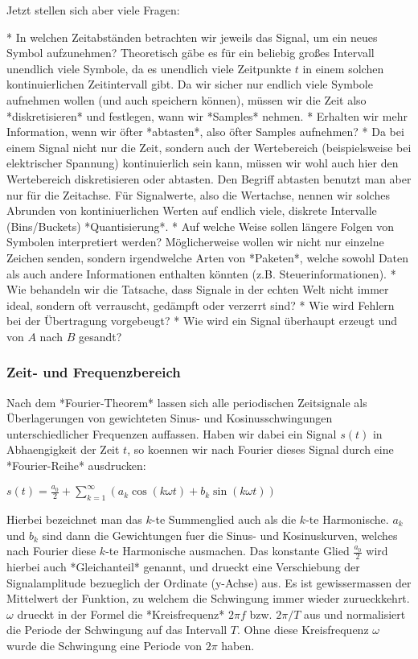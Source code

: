 Jetzt stellen sich aber viele Fragen:

* In welchen Zeitabständen betrachten wir jeweils das Signal, um ein neues
  Symbol aufzunehmen? Theoretisch gäbe es für ein beliebig großes Intervall
  unendlich viele Symbole, da es unendlich viele Zeitpunkte $t$ in einem solchen
  kontinuierlichen Zeitintervall gibt. Da wir sicher nur endlich viele Symbole
  aufnehmen wollen (und auch speichern können), müssen wir die Zeit also
  *diskretisieren* und festlegen, wann wir *Samples* nehmen.
* Erhalten wir mehr Information, wenn wir öfter *abtasten*, also öfter Samples
  aufnehmen?
* Da bei einem Signal nicht nur die Zeit, sondern auch der Wertebereich
  (beispielsweise bei elektrischer Spannung) kontinuierlich sein kann, müssen
  wir wohl auch hier den Wertebereich diskretisieren oder abtasten. Den Begriff
  abtasten benutzt man aber nur für die Zeitachse. Für Signalwerte, also die
  Wertachse, nennen wir solches Abrunden von kontiniuerlichen Werten auf endlich
  viele, diskrete Intervalle (Bins/Buckets) *Quantisierung*.
* Auf welche Weise sollen längere Folgen von Symbolen interpretiert werden?
  Möglicherweise wollen wir nicht nur einzelne Zeichen senden, sondern
  irgendwelche Arten von *Paketen*, welche sowohl Daten als auch andere
  Informationen enthalten könnten (z.B. Steuerinformationen).
* Wie behandeln wir die Tatsache, dass Signale in der echten Welt nicht immer
  ideal, sondern oft verrauscht, gedämpft oder verzerrt sind?
* Wie wird Fehlern bei der Übertragung vorgebeugt?
* Wie wird ein Signal überhaupt erzeugt und von $A$ nach $B$ gesandt?

\subsubsection{ Zeit- und Frequenzbereich}

Nach dem *Fourier-Theorem* lassen sich alle periodischen Zeitsignale als
Überlagerungen von gewichteten Sinus- und Kosinusschwingungen unterschiedlicher
Frequenzen auffassen. Haben wir dabei ein Signal $s(t)$ in Abhaengigkeit der
Zeit $t$, so koennen wir nach Fourier dieses Signal durch eine *Fourier-Reihe*
ausdrucken:

$s(t) = \frac{a_0}{2} + \sum_{k=1}^\infty (a_k \cos(k\omega t) + b_k \sin(k
\omega t))$

Hierbei bezeichnet man das $k$-te Summenglied auch als die $k$-te
Harmonische. $a_k$ und $b_k$ sind dann die Gewichtungen fuer die Sinus- und
Kosinuskurven, welches nach Fourier diese $k$-te Harmonische ausmachen.  Das
konstante Glied $\frac{a_0}{2}$ wird hierbei auch *Gleichanteil* genannt, und
drueckt eine Verschiebung der Signalamplitude bezueglich der Ordinate (y-Achse)
aus. Es ist gewissermassen der Mittelwert der Funktion, zu welchem die
Schwingung immer wieder zurueckkehrt. $\omega$ drueckt in der Formel die
*Kreisfrequenz* $2\pi f$ bzw. $2\pi/T$ aus und normalisiert die Periode der
Schwingung auf das Intervall $T$. Ohne diese Kreisfrequenz $\omega$ wurde die
Schwingung eine Periode von $2\pi$ haben.

